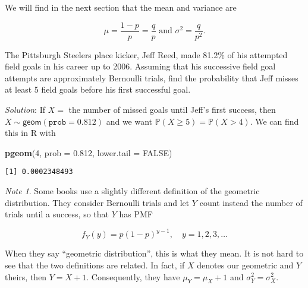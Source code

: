 \documentclass[]{book}
\newenvironment{Shaded}{\begin{snugshade}}{\end{snugshade}}
\newcommand{\KeywordTok}[1]{\textcolor[rgb]{0.13,0.29,0.53}{\textbf{{#1}}}}
\newcommand{\DataTypeTok}[1]{\textcolor[rgb]{0.13,0.29,0.53}{{#1}}}
\newcommand{\DecValTok}[1]{\textcolor[rgb]{0.00,0.00,0.81}{{#1}}}
\newcommand{\FloatTok}[1]{\textcolor[rgb]{0.00,0.00,0.81}{{#1}}}
\newcommand{\OtherTok}[1]{\textcolor[rgb]{0.56,0.35,0.01}{{#1}}}
\newcommand{\NormalTok}[1]{{#1}}
\numberwithin{equation}{chapter}
\numberwithin{figure}{chapter}
\theoremstyle{plain}
\theoremstyle{definition}
\theoremstyle{remark}
\newtheorem{note}[thm]{Note}
\theoremstyle{definition}
\theoremstyle{definition}
\theoremstyle{remark}
\let\BeginKnitrBlock\begin \let\EndKnitrBlock\end
\begin{document}
We will find in the next section that the mean and variance are

\begin{equation}
\mu=\frac{1-p}{p}=\frac{q}{p}\mbox{ and }\sigma^{2}=\frac{q}{p^{2}}.
\end{equation}

\bigskip

\BeginKnitrBlock{example}
\protect\hypertarget{ex:unnamed-chunk-233}{}{\label{ex:unnamed-chunk-233}}The
Pittsburgh Steelers place kicker, Jeff Reed, made 81.2\% of his
attempted field goals in his career up to 2006. Assuming that his
successive field goal attempts are approximately Bernoulli trials, find
the probability that Jeff misses at least 5 field goals before his first
successful goal.
\EndKnitrBlock{example}

\emph{Solution}: If \(X=\) the number of missed goals until Jeff's first
success, then \(X\sim\mathsf{geom}(\mathtt{prob}=0.812)\) and we want
\(\mathbb{P}(X\geq5)=\mathbb{P}(X>4)\). We can find this in R with

\begin{Shaded}
\begin{Highlighting}[]
\KeywordTok{pgeom}\NormalTok{(}\DecValTok{4}\NormalTok{, }\DataTypeTok{prob =} \FloatTok{0.812}\NormalTok{, }\DataTypeTok{lower.tail =} \OtherTok{FALSE}\NormalTok{)}
\end{Highlighting}
\end{Shaded}

\begin{verbatim}
[1] 0.0002348493
\end{verbatim}

\bigskip

\begin{note}
Some books use a slightly different definition of the geometric
distribution. They consider Bernoulli trials and let \(Y\) count instead
the number of trials until a success, so that \(Y\) has PMF

\begin{equation}
f_{Y}(y)=p(1-p)^{y-1},\quad y=1,2,3,\ldots
\end{equation}

When they say ``geometric distribution'', this is what they mean. It is
not hard to see that the two definitions are related. In fact, if \(X\)
denotes our geometric and \(Y\) theirs, then \(Y=X+1\). Consequently,
they have \(\mu_{Y}=\mu_{X}+1\) and \(\sigma_{Y}^{2}=\sigma_{X}^{2}\).
\end{note}
\end{document}

